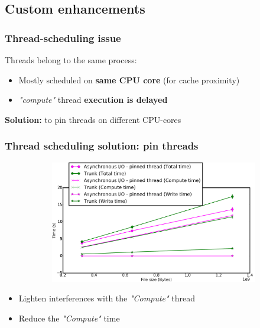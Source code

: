 \documentclass[slidestop,xcolor=dvipsnames, notes=hide]{beamer}
\begin{document}
	\subsection{Custom enhancements}
		\begin{frame}
			\frametitle{Thread-scheduling issue}
			Threads belong to the same process:
			\begin{itemize}
				\item Mostly scheduled on \textbf{same CPU core} (for cache proximity)
				\item \emph{"compute"} thread \textbf{execution is delayed}
			\end{itemize}
			\pause
			\textbf{Solution:} to pin threads on different CPU-cores
		\end{frame}


		\begin{frame}
			\frametitle{Thread scheduling solution: pin threads}
			\center
			\begin{figure}[!h]
				\centering
				\begin{subfigure}[b]{0.73\textwidth}
					\centering
					\includegraphics[width=\textwidth]{images/cubeRemapper_pthreadWrap_hpc.png}
				\end{subfigure}
			\end{figure}

			\begin{block}{}
			\begin{itemize}
				\item Lighten interferences with the \emph{"Compute"} thread
				\item Reduce the \emph{"Compute"} time
			\end{itemize}
			\end{block}
		\end{frame}
\end{document}

